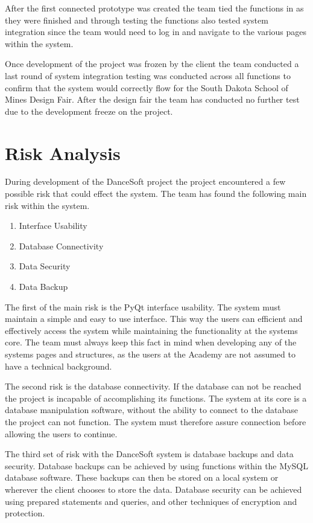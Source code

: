 After the first connected prototype was created the team tied the functions in as they were finished and through testing the functions also tested system integration since the team would need to log in and navigate to the various pages within the system. 

Once development of the project was frozen by the client the team conducted a last round of system integration testing was conducted across all functions to confirm that the system would correctly flow for the South Dakota School of Mines Design Fair. After the design fair the team has conducted no further test due to the development freeze on the project.


\section{Risk Analysis}
During development of the DanceSoft project the project encountered a few possible risk that could effect the system. The team has found the following main risk within the system.

\begin{enumerate}
\item Interface Usability
\item Database Connectivity
\item Data Security
\item Data Backup
\end{enumerate}

The first of the main risk is the PyQt interface usability. The system must maintain a simple and easy to use interface. This way the users can efficient and effectively access the system while maintaining the functionality at the systems core. The team must always keep this fact in mind when developing any of the systems pages and structures, as the users at the Academy are not assumed to have a technical background.

The second risk is the database connectivity. If the database can not be reached the project is incapable of accomplishing its functions. The system at its core is a database manipulation software, without the ability to connect to the database the project can not function. The system must therefore assure connection before allowing the users to continue.

The third set of risk with the DanceSoft system is database backups and data security. Database backups can be achieved by using functions within the MySQL database software. These backups can then be stored on a local system or wherever the client chooses to store the data. Database security can be achieved using prepared statements and queries, and other techniques of encryption and protection.  


